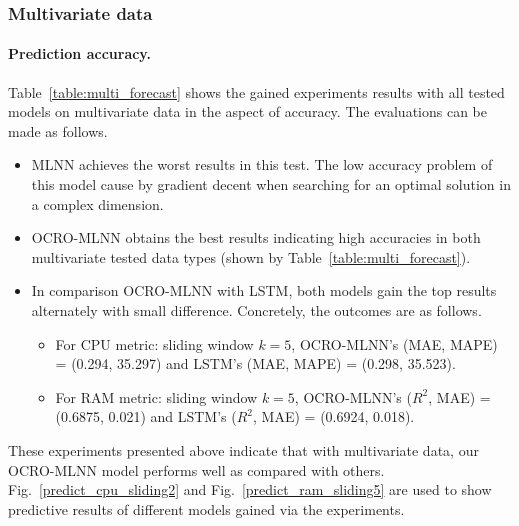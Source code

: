 \documentclass[smallcondensed, natbib]{svjour3}     %
\begin{document}
{\subsubsection{Multivariate data}

\paragraph{\textbf{Prediction accuracy.}} Table~\ref{table:multi_forecast} shows the gained experiments results with all tested models on multivariate data in the aspect of accuracy. The evaluations can be made as follows.

\begin{itemize}
\item MLNN achieves the worst results in this test. The low accuracy problem of this model cause by gradient decent when searching for an optimal solution in a complex dimension. 
\item OCRO-MLNN obtains the best results indicating high accuracies in both multivariate tested data types (shown by Table~\ref{table:multi_forecast}).
\item In comparison OCRO-MLNN with LSTM, both models gain the top results alternately with small difference. Concretely, the outcomes are as follows. 
	\begin{itemize}
	\item For CPU metric: sliding window $k = 5$, OCRO-MLNN's (MAE, MAPE) = (0.294, 35.297) and LSTM's (MAE, MAPE) = (0.298, 35.523).
	\item For RAM metric: sliding window $k = 5$, OCRO-MLNN's ($R^2$, MAE) = (0.6875, 0.021) and LSTM's ($R^2$, MAE) = (0.6924, 0.018).
	\end{itemize}
\end{itemize}

These experiments presented above indicate that with multivariate data, our OCRO-MLNN model performs well as compared with others. Fig.~\ref{predict_cpu_sliding2} and Fig.~\ref{predict_ram_sliding5} are used to show predictive results of different models gained via the experiments.

}
\end{document}
